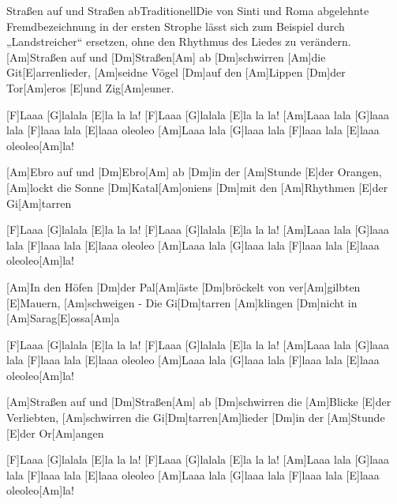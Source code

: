 \documentclass[../main.tex]{subfiles}
\begin{document}
\begin{song}{Straßen auf und Straßen ab}{Traditionell}{Die von Sinti und Roma abgelehnte Fremdbezeichnung in der ersten Strophe lässt sich zum Beispiel durch „Landstreicher“ ersetzen, ohne den Rhythmus des Liedes zu verändern.}
[Am]Straßen auf und [Dm]Straßen[Am]{ ab} [Dm]schwirren [Am]die Git[E]arrenlieder,
[Am]seidne Vögel [Dm]auf den [Am]Lippen [Dm]der Tor[Am]eros [E]und Zig[Am]euner.

[F]Laaa [G]lalala [E]la la la! [F]Laaa [G]lalala [E]la la la!
[Am]Laaa lala [G]laaa lala [F]laaa lala [E]laaa oleoleo
[Am]Laaa lala [G]laaa lala [F]laaa lala [E]laaa oleoleo[Am]la!

[Am]Ebro auf und [Dm]Ebro[Am]{ ab} [Dm]in der [Am]Stunde [E]der Orangen,
[Am]lockt die Sonne [Dm]Katal[Am]oniens [Dm]mit den [Am]Rhythmen [E]der Gi[Am]tarren

[F]Laaa [G]lalala [E]la la la! [F]Laaa [G]lalala [E]la la la!
[Am]Laaa lala [G]laaa lala [F]laaa lala [E]laaa oleoleo
[Am]Laaa lala [G]laaa lala [F]laaa lala [E]laaa oleoleo[Am]la!

[Am]In den Höfen [Dm]der Pal[Am]{ä}ste [Dm]bröckelt von ver[Am]gilbten [E]Mauern,
[Am]schweigen - Die Gi[Dm]tarren [Am]klingen [Dm]nicht in [Am]Sarag[E]ossa[Am]a

[F]Laaa [G]lalala [E]la la la! [F]Laaa [G]lalala [E]la la la!
[Am]Laaa lala [G]laaa lala [F]laaa lala [E]laaa oleoleo
[Am]Laaa lala [G]laaa lala [F]laaa lala [E]laaa oleoleo[Am]la!

[Am]Straßen auf und [Dm]Straßen[Am]{ ab} [Dm]schwirren die [Am]Blicke [E]der Verliebten,
[Am]schwirren die Gi[Dm]tarren[Am]lieder [Dm]in der [Am]Stunde [E]der Or[Am]angen

[F]Laaa [G]lalala [E]la la la! [F]Laaa [G]lalala [E]la la la!
[Am]Laaa lala [G]laaa lala [F]laaa lala [E]laaa oleoleo
[Am]Laaa lala [G]laaa lala [F]laaa lala [E]laaa oleoleo[Am]la!

\end{song}
\end{document}
